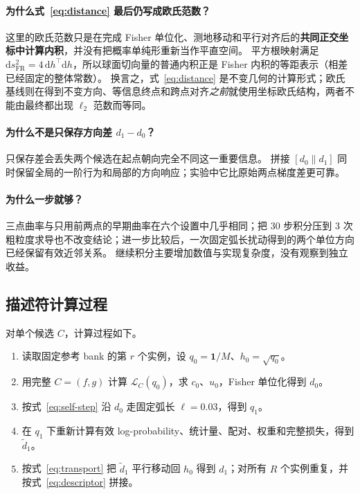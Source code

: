 \documentclass[UTF8,11pt]{ctexart}
\newcommand{\concat}{\mathbin{\|}}
\begin{document}
\paragraph{为什么式~\eqref{eq:distance} 最后仍写成欧氏范数？}
这里的欧氏范数只是在完成 Fisher 单位化、测地移动和平行对齐后的\textbf{共同正交坐标中计算内积}，并没有把概率单纯形重新当作平直空间。
平方根映射满足 $\mathrm ds_{\mathrm{FR}}^2=4\,\mathrm dh^\top\mathrm dh$，所以球面切向量的普通内积正是 Fisher 内积的等距表示（相差已经固定的整体常数）。
换言之，式~\eqref{eq:distance} 是不变几何的计算形式；欧氏基线则在得到不变方向、等信息终点和跨点对齐\emph{之前}就使用坐标欧氏结构，两者不能由最终都出现 $\ell_2$ 范数而等同。

\paragraph{为什么不是只保存方向差 $d_1-d_0$？}
只保存差会丢失两个候选在起点朝向完全不同这一重要信息。
拼接 $[d_0\concat d_1]$ 同时保留全局的一阶行为和局部的方向响应；实验中它比原始两点梯度差更可靠。

\paragraph{为什么一步就够？}
三点曲率与只用前两点的早期曲率在六个设置中几乎相同；把 30 步积分压到 3 次粗粒度求导也不改变结论；进一步比较后，一次固定弧长扰动得到的两个单位方向已经保留有效近邻关系。
继续积分主要增加数值与实现复杂度，没有观察到独立收益。

\subsection{描述符计算过程}

对单个候选 $C$，计算过程如下。

\begin{enumerate}
  \item 读取固定参考 bank 的第 $r$ 个实例，设 $q_0=\bm 1/M$、$h_0=\sqrt{q_0}$。
  \item 用完整 $C=(f,g)$ 计算 $\mathcal L_C(q_0)$，求 $c_0$、$u_0$，Fisher 单位化得到 $d_0$。
  \item 按式~\eqref{eq:self-step} 沿 $d_0$ 走固定弧长 $\ell=0.03$，得到 $q_1$。
  \item 在 $q_1$ 下重新计算有效 log-probability、统计量、配对、权重和完整损失，得到 $\widetilde d_1$。
  \item 按式~\eqref{eq:transport} 把 $\widetilde d_1$ 平行移动回 $h_0$ 得到 $d_1$；对所有 $R$ 个实例重复，并按式~\eqref{eq:descriptor} 拼接。
\end{enumerate}
\end{document}
